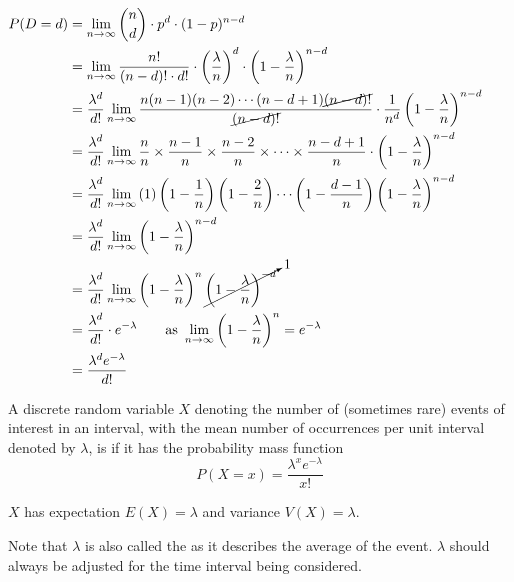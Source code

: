 $\begin{aligned}[t]
    P(D = d)
     & = \lim_{n \to \infty} \binom{n}{d} \cdot p^d \cdot (1 - p)^{n - d} \\
     & = \lim_{n \to \infty} \frac{n!}{(n - d)! \cdot d!} \cdot \left( \frac{\lambda}{n} \right)^d \cdot \left( 1 - \frac{\lambda}{n} \right)^{n - d} \\
     & = \frac{\lambda^d}{d!} \lim_{n \to \infty} \frac{n(n-1)(n-2)\cdots(n-d+1)\cancel{(n-d)!}}{\cancel{(n-d)!}} \cdot \frac{1}{n^d} \left( 1 - \frac{\lambda}{n} \right)^{n-d} \\
     & = \frac{\lambda^d}{d!} \lim_{n \to \infty} \frac{n}{n} \times \frac{n-1}{n} \times \frac{n-2}{n} \times \cdots \times \frac{n-d+1}{n} \cdot \left( 1 - \frac{\lambda}{n} \right)^{n-d} \\
     & = \frac{\lambda^d}{d!} \lim_{n \to \infty} \left( 1 \right) \left( 1 - \frac{1}{n} \right) \left( 1 - \frac{2}{n} \right) \cdots \left(1 - \frac{d-1}{n} \right) \left( 1 - \frac{\lambda}{n} \right)^{n-d} \\
     & = \frac{\lambda^d}{d!} \lim_{n \to \infty} \left( 1 - \frac{\lambda}{n} \right)^{n-d} \\
     & = \frac{\lambda^d}{d!} \lim_{n \to \infty} \left( 1 - \frac{\lambda}{n} \right)^n \cancelto{1}{\left( 1 - \frac{\lambda}{n} \right)^{-d}} \\
     & = \frac{\lambda^d}{d!}  \cdot e^{-\lambda} \qquad \text{as } \lim_{n \to \infty} \left( 1 - \frac{\lambda}{n} \right)^n = e^{-\lambda} \\
     & = \frac{\lambda^d e^{-\lambda}}{d!}
\end{aligned}$

\begin{definition}
    A discrete random variable $X$ denoting the number of (sometimes rare) events of interest in an interval, with the mean number of occurrences per unit interval denoted by $\lambda$, is  if it has the probability mass function $$P(X = x) = \frac{\lambda^x e^{-\lambda}}{x!}$$

    $X$ has expectation $E(X) = \lambda$ and variance $V(X) = \lambda$. 
\end{definition}

Note that $\lambda$ is also called the  as it describes the average  of the event. $\lambda$ should always be adjusted for the time interval being considered. 

